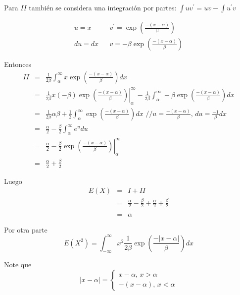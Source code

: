 \begin{i}
Para $II$ también se considera una integración por partes: $\int uv^{\prime }=uv-\int u^{\prime }v$

\begin{equation*}
\begin{array}{ccc}
u=x &  & v^{\prime }=\exp \left( \frac{-(x-\alpha )}{\beta }\right) \\ 
du=dx &  & v=-\beta \exp \left( \frac{-(x-\alpha )}{\beta }\right)
\end{array}%
\end{equation*}

Entonces
\begin{eqnarray*}
II &=&\frac{1}{2\beta }\int_{\alpha }^{\infty }x\exp \left( \frac{-(x-\alpha
)}{\beta }\right) dx \\
&=&\left. \frac{1}{2\beta }x(-\beta )\exp \left( \frac{-(x-\alpha )}{\beta }
\right) \right\vert _{\alpha }^{\infty }-\frac{1}{2\beta }\int_{\alpha
}^{\infty }-\beta \exp \left( \frac{-(x-\alpha )}{\beta }\right) dx \\
&=&\frac{1}{2\beta }\alpha \beta +\frac{1}{2}\int_{\alpha }^{\infty }\exp
\left( \frac{-(x-\alpha )}{\beta }\right) dx\text{ \ \ \ //}u=\frac{
-(x-\alpha )}{\beta }\text{, \ }du=\frac{-1}{\beta }dx \\
&=&\frac{\alpha }{2}-\frac{\beta }{2}\int_{\alpha }^{\infty }e^{u}du \\
&=&\frac{\alpha }{2}-\left. \frac{\beta }{2}\exp \left( \frac{-(x-\alpha )}{
\beta }\right) \right\vert _{\alpha }^{\infty } \\
&=&\frac{\alpha }{2}+\frac{\beta }{2}
\end{eqnarray*}

Luego 
\begin{eqnarray*}
E(X) &=&I+II \\
&=&\frac{\alpha }{2}-\frac{\beta }{2}+\frac{\alpha }{2}+\frac{\beta }{2} \\
&& \\
&=&\alpha
\end{eqnarray*}

Por otra parte
\begin{equation*}
E(X^{2})=\int_{-\infty }^{\infty }x^{2}\frac{1}{2\beta }\exp \left( \frac{-\left\vert x-\alpha \right\vert }{\beta }\right) dx
\end{equation*}

Note que 
\begin{equation*}
\left\vert x-\alpha \right\vert =\left\{ 
\begin{array}{c}
x-\alpha \text{, }x>\alpha \\ 
-(x-\alpha )\text{, }x<\alpha
\end{array}
\right.
\end{equation*}


\end{i}
